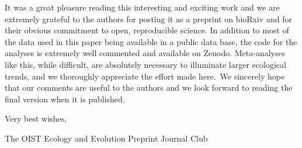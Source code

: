 \documentclass[10pt]{article}
\begin{document}
It was a great pleasure reading this interesting and exciting work and
we are extremely grateful to the authors for posting it as a preprint on
bioRxiv and for their obvious commitment to open, reproducible science.
In addition to most of the data used in this paper being available in a
public data base, the code for the analyses is extremely well commented
and available on Zenodo. Meta-analyses like this, while difficult, are
absolutely necessary to illuminate larger ecological trends, and we
thoroughly appreciate the effort made here.~We sincerely hope that our
comments are useful to the authors and we look forward to reading the
final version when it is published.~

Very best wishes,

The OIST Ecology and Evolution Preprint Journal Club

\par\null

\FloatBarrier
\end{document}
